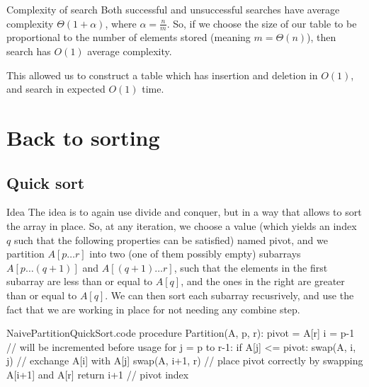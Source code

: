 \documentclass[a4paper]{article}
\begin{document}
\begin{parag}{Complexity of search}
    Both successful and unsuccessful searches have average complexity $\Theta\left(1 + \alpha\right)$, where $\alpha = \frac{n}{m}$. So, if we choose the size of our table to be proportional to the number of elements stored (meaning $m = \Theta\left(n\right)$), then search has $O\left(1\right)$ average complexity.

    This allowed us to construct a table which has insertion and deletion in $O\left(1\right)$, and search in expected $O\left(1\right)$ time.
\end{parag}

\section{Back to sorting}
\subsection{Quick sort}
\begin{parag}{Idea}
    The idea is to again use divide and conquer, but in a way that allows to sort the array in place. So, at any iteration, we choose a value (which yields an index $q$ such that the following properties can be satisfied) named pivot, and we partition $A\left[p\ldots r\right]$ into two (one of them possibly empty) subarrays $A\left[p\ldots \left(q+1\right)\right]$ and $A\left[\left(q+1\right) \ldots r\right]$, such that the elements in the first subarray are less than or equal to $A\left[q\right]$, and the ones in the right are greater than or equal to $A\left[q\right]$. We can then sort each subarray recusrively, and use the fact that we are working in place for not needing any combine step.

\end{parag}


\begin{filecontents*}[overwrite]{NaivePartitionQuickSort.code}
procedure Partition(A, p, r):
    pivot = A[r]
    i = p-1  // will be incremented before usage
    for j = p to r-1:
        if A[j] <= pivot:
            swap(A, i, j)  // exchange A[i] with A[j]
    swap(A, i+1, r)  // place pivot correctly by swapping A[i+1] and A[r]
    return i+1  // pivot index
\end{filecontents*}
\end{document}
